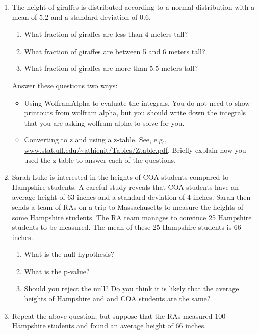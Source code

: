 \documentclass[12pt]{article}
\begin{document}

\begin{enumerate}
\setlength{\itemsep}{-1mm}
\item The height of giraffes is distributed according to a normal
  distribution with a mean of $5.2$ and a standard deviation of
  $0.6$.  
\begin{enumerate}
\setlength{\itemsep}{-1mm}
\item What fraction of giraffes are less than 4 meters tall?
\item What fraction of giraffes are between 5 and 6 meters tall?
\item What fraction of giraffes are more than 5.5 meters tall?
\end{enumerate}
Answer these questions two ways:
\begin{itemize}
\setlength{\itemsep}{-1mm}
\item Using WolframAlpha to evaluate the integrals.  You do not need
  to show printouts from wolfram alpha, but you should write down the
  integrals that you are asking wolfram alpha to solve for you.
\item Converting to z and using a z-table. See, e.g.,
  \url{www.stat.ufl.edu/~athienit/Tables/Ztable.pdf}.  Briefly explain
  how you used the z table to answer each of the questions. 
\end{itemize}

\item Sarah Luke is interested in the heights of COA students compared
  to Hampshire students.  A careful study reveals that COA students
  have an average height of 63 inches and a standard deviation of 4
  inches.  Sarah then sends a team of RAs on a trip to Massachusetts
  to measure the heights of some Hampshire students.  The RA team
  manages to convince 25 Hampshire students to be measured.  The mean
  of these 25 Hampshire students is 66 inches. 
\begin{enumerate}
\setlength{\itemsep}{-1mm}
  \item What is the null hypothesis?
  \item What is the p-value?
  \item Should you reject the null?  Do you think it is likely that
    the average heights of Hampshire and and COA students are the
    same? 
\end{enumerate}

\item Repeat the above question, but suppose that the RAs measured 100
  Hampshire students and found an average height of 66 inches.  

\end{enumerate}
\end{document}
